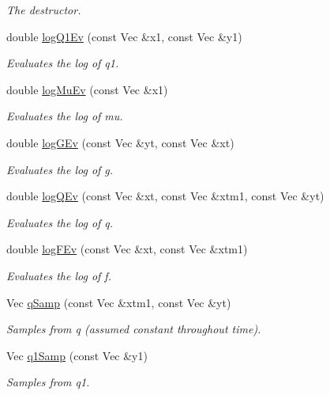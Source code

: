 \begin{DoxyCompactItemize}
\begin{DoxyCompactList}\small\item\em The destructor. \end{DoxyCompactList}\item 
double \hyperlink{classSVolFilter_a9adc1eb288e46a2e05fa89d1b8d9f1ef}{log\+Q1\+Ev} (const Vec \&x1, const Vec \&y1)
\begin{DoxyCompactList}\small\item\em Evaluates the log of q1. \end{DoxyCompactList}\item 
double \hyperlink{classSVolFilter_ab052dcfa9ce2100ffb02350ccf0b6d17}{log\+Mu\+Ev} (const Vec \&x1)
\begin{DoxyCompactList}\small\item\em Evaluates the log of mu. \end{DoxyCompactList}\item 
double \hyperlink{classSVolFilter_a81a8e2857ddb699738461b5e2beab1c0}{log\+G\+Ev} (const Vec \&yt, const Vec \&xt)
\begin{DoxyCompactList}\small\item\em Evaluates the log of g. \end{DoxyCompactList}\item 
double \hyperlink{classSVolFilter_af2bbbe9c2d3bddb3e85b9ed5a14a24cb}{log\+Q\+Ev} (const Vec \&xt, const Vec \&xtm1, const Vec \&yt)
\begin{DoxyCompactList}\small\item\em Evaluates the log of q. \end{DoxyCompactList}\item 
double \hyperlink{classSVolFilter_a506d813662f0d888e48607962bfefbbd}{log\+F\+Ev} (const Vec \&xt, const Vec \&xtm1)
\begin{DoxyCompactList}\small\item\em Evaluates the log of f. \end{DoxyCompactList}\item 
Vec \hyperlink{classSVolFilter_a754e3c40b1db7798a48f3f4ad636b07c}{q\+Samp} (const Vec \&xtm1, const Vec \&yt)
\begin{DoxyCompactList}\small\item\em Samples from q (assumed constant throughout time). \end{DoxyCompactList}\item 
Vec \hyperlink{classSVolFilter_aaea1d4b59cdd3053f060d5013e338162}{q1\+Samp} (const Vec \&y1)
\begin{DoxyCompactList}\small\item\em Samples from q1. \end{DoxyCompactList}\end{DoxyCompactItemize}


